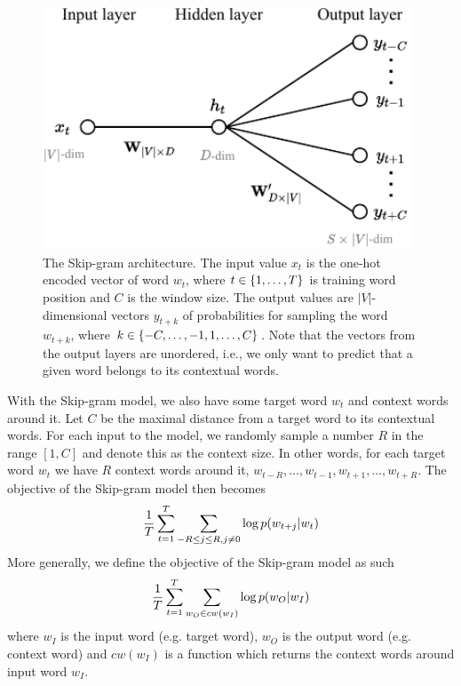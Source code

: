 \begin{figure}[H]
    \centering
    \includegraphics[width=11cm]{thesis/figures/skim-gram_cropped.pdf}
    \caption{The Skip-gram architecture. The input value $x_t$ is the one-hot encoded vector of word $w_t$, where $t \in \left\{1, \ldots, T\right\}$ is training word position and $C$ is the window size. The output values are $|V|$-dimensional vectors $y_{t+k}$ of probabilities for sampling the word $w_{t+k}$, where $k \in \left\{-C, \ldots, -1, 1, \ldots, C\right\}$. Note that the vectors from the output layers are unordered, i.e., we only want to predict that a given word belongs to its contextual words.}
    \label{fig:skip-gram-model}
\end{figure}

With the Skip-gram model, we also have some target word $w_t$ and context words around it. Let $C$ be the maximal distance from a target word to its contextual words. For each input to the model, we randomly sample a number $R$ in the range $[1, C]$ and denote this as the context size. In other words, for each target word $w_t$ we have $R$ context words around it, $w_{t-R}, \ldots, w_{t-1}, w_{t+1}, \ldots, w_{t+R}$. The objective of the Skip-gram model then becomes
\begin{align}
    \frac{1}{T} \sum\limits_{t=1}^{T} \sum\limits_{-R \leq j \leq R, j \neq 0}^{} \log p(w_{t+j} | w_t)
    \label{eqn:skip-gram-objective-function}
\end{align}
More generally, we define the objective of the Skip-gram model as such
\begin{align}
    \frac{1}{T} \sum\limits_{t=1}^{T} \sum\limits_{w_O \in cw(w_I)}^{} \log p(w_O | w_I)
    \label{eqn:skip-gram-objective-function-general}
\end{align}
where $w_I$ is the input word (e.g. target word), $w_O$ is the output word (e.g. context word) and $cw(w_I)$ is a function which returns the context words around input word $w_I$.

